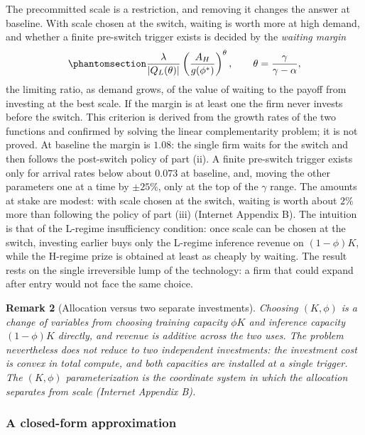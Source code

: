 \documentclass[
  11pt,
  letterpaper,
]{scrartcl}
\begin{document}
The precommitted scale is a restriction, and removing it changes the
answer at baseline. With scale chosen at the switch, waiting is worth
more at high demand, and whether a finite pre-switch trigger exists is
decided by the \emph{waiting margin}
\begin{equation}\protect\phantomsection\label{eq-waiting-margin}{
\frac{\lambda}{|Q_L(\theta)|} \left(\frac{A_H}{g(\phi^*)}\right)^{\theta}, \qquad \theta = \frac{\gamma}{\gamma - \alpha},
}\end{equation} the limiting ratio, as demand grows, of the value of
waiting to the payoff from investing at the best scale. If the margin is
at least one the firm never invests before the switch. This criterion is
derived from the growth rates of the two functions and confirmed by
solving the linear complementarity problem; it is not proved. At
baseline the margin is \(1.08\): the single firm waits for the switch
and then follows the post-switch policy of part (ii). A finite
pre-switch trigger exists only for arrival rates below about \(0.073\)
at baseline, and, moving the other parameters one at a time by
\(\pm 25\%\), only at the top of the \(\gamma\) range. The amounts at
stake are modest: with scale chosen at the switch, waiting is worth
about \(2\%\) more than following the policy of part (iii) (Internet
Appendix B). The intuition is that of the L-regime insufficiency
condition: once scale can be chosen at the switch, investing earlier
buys only the L-regime inference revenue on \((1-\phi)K\), while the
H-regime prize is obtained at least as cheaply by waiting. The result
rests on the single irreversible lump of the technology: a firm that
could expand after entry would not face the same choice.

\textbf{Remark 2} (Allocation versus two separate investments).
\emph{Choosing \((K, \phi)\) is a change of variables from choosing
training capacity \(\phi K\) and inference capacity \((1-\phi)K\)
directly, and revenue is additive across the two uses. The problem
nevertheless does not reduce to two independent investments: the
investment cost is convex in total compute, and both capacities are
installed at a single trigger. The \((K, \phi)\) parameterization is the
coordinate system in which the allocation separates from scale (Internet
Appendix B).}

\subsubsection{A closed-form
approximation}\label{a-closed-form-approximation}
\end{document}
